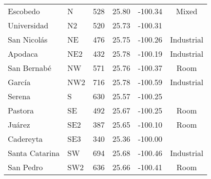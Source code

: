 \begin{table}[H]
\begin{tabular}{llcccc}
        Escobedo       & N    & 528               & 25.80    & -100.34   & Mixed          \\
        Universidad    & N2   & 520               & 25.73    & -100.31   &                \\
        San Nicolás    & NE   & 476               & 25.75    & -100.26   & Industrial     \\
        Apodaca        & NE2  & 432               & 25.78    & -100.19   & Industrial     \\
        San Bernabé    & NW   & 571               & 25.76    & -100.37   & Room           \\
        García         & NW2  & 716               & 25.78    & -100.59   & Industrial     \\
        Serena         & S    & 630               & 25.57    & -100.25   &                \\
        Pastora        & SE   & 492               & 25.67    & -100.25   & Room           \\
        Juárez         & SE2  & 387               & 25.65    & -100.10   & Room           \\
        Cadereyta      & SE3  & 340               & 25.36    & -100.00   &                \\
        Santa Catarina & SW   & 694               & 25.68    & -100.46   & Industrial     \\
        San Pedro      & SW2  & 636               & 25.66    & -100.41   & Room           \\ \hline
    \end{tabular}
    \caption{}
    \label{table:stations_loc}
\end{table}